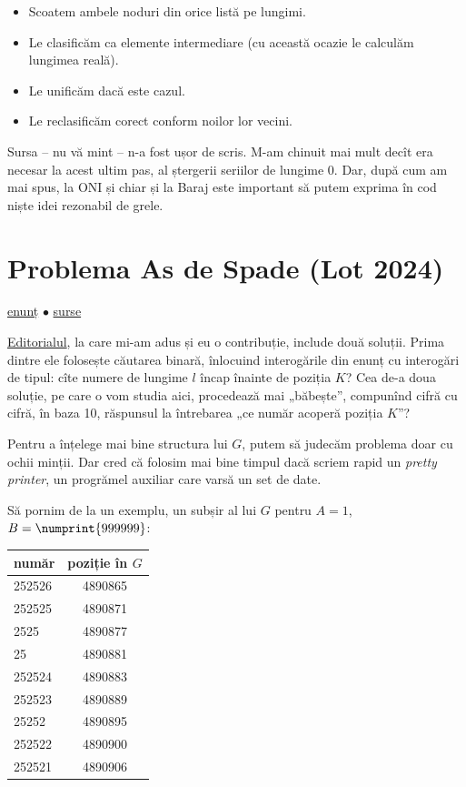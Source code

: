 \begin{itemize}
  \item Scoatem ambele noduri din orice listă pe lungimi.
  \item Le clasificăm ca elemente intermediare (cu această ocazie le calculăm lungimea reală).
  \item Le unificăm dacă este cazul.
  \item Le reclasificăm corect conform noilor lor vecini.
\end{itemize}

Sursa -- nu vă mint -- n-a fost ușor de scris. M-am chinuit mai mult decît era necesar la acest ultim pas, al ștergerii seriilor de lungime 0. Dar, după cum am mai spus, la ONI și chiar și la Baraj este important să putem exprima în cod niște idei rezonabil de grele.


\section{Problema As de Spade (Lot 2024)}
\label{problem:as-de-spade}

\href{https://kilonova.ro/problems/2806}{enunț}
$\bullet$
\hyperref[code:as-de-spade]{surse}

\href{https://github.com/roalgo-discord/Romanian-Olympiad-Solutions/blob/main/Baraj\%20\%2B\%20Lot\%20Seniori\%20(IOI\%20team\%20selection\%20tests)/2024/Lot\%202\%20Seniori\%202024.pdf}{Editorialul}, la care mi-am adus și eu o contribuție, include două soluții. Prima dintre ele folosește căutarea binară, înlocuind interogările din enunț cu interogări de tipul: cîte numere de lungime $l$ încap înainte de poziția $K$? Cea de-a doua soluție, pe care o vom studia aici, procedează mai „băbește”, compunînd cifră cu cifră, în baza 10, răspunsul la întrebarea „ce număr acoperă poziția $K$”?

Pentru a înțelege mai bine structura lui $G$, putem să judecăm problema doar cu ochii minții. Dar cred că folosim mai bine timpul dacă scriem rapid un \textit{pretty printer}, un progrămel auxiliar care varsă un set de date.

Să pornim de la un exemplu, un subșir al lui $G$ pentru $A=1$, $B=\numprint{999999}$:

\begin{table}[H]
  \centering
  \begin{tabular}{ l | c }
    \hline
    număr & poziție în $G$  \\
    \hline
    252526 & 4890865 \\
    252525 & 4890871 \\
    2525 & 4890877 \\
    25 & 4890881 \\
    252524 & 4890883 \\
    252523 & 4890889 \\
    25252 & 4890895 \\
    252522 & 4890900 \\
    252521 & 4890906 \\
    \hline
  \end{tabular}
\end{table}

